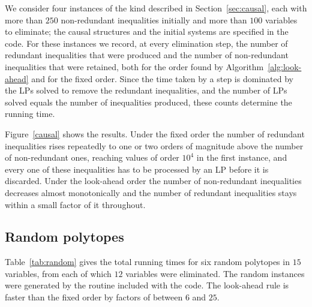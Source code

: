 \documentclass[11pt]{article}
\theoremstyle{definition}
\begin{document}
We consider four instances of the kind described in Section~\ref{sec:causal}, each with more than $250$ non-redundant inequalities initially and more than $100$ variables to eliminate; the causal structures and the initial systems are specified in the code. For these instances we record, at every elimination step, the number of redundant inequalities that were produced and the number of non-redundant inequalities that were retained, both for the order found by Algorithm~\ref{alg:look-ahead} and for the fixed order. Since the time taken by a step is dominated by the LPs solved to remove the redundant inequalities, and the number of LPs solved equals the number of inequalities produced, these counts determine the running time.

Figure~\ref{causal} shows the results. Under the fixed order the number of redundant inequalities rises repeatedly to one or two orders of magnitude above the number of non-redundant ones, reaching values of order $10^4$ in the first instance, and every one of these inequalities has to be processed by an LP before it is discarded. Under the look-ahead order the number of non-redundant inequalities decreases almost monotonically and the number of redundant inequalities stays within a small factor of it throughout.

\subsection{Random polytopes}
\label{sec:resultsrandom}
Table~\ref{tab:random} gives the total running times for six random polytopes in $15$ variables, from each of which $12$ variables were eliminated. The random instances were generated by the routine included with the code. The look-ahead rule is faster than the fixed order by factors of between $6$ and $25$.
\end{document}
